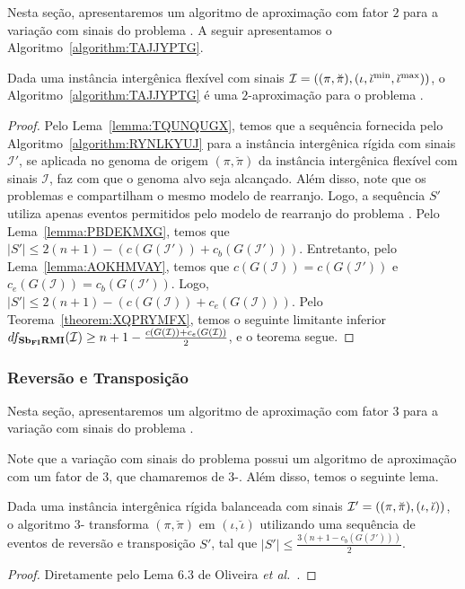 Nesta seção, apresentaremos um algoritmo de aproximação com fator $2$ para a variação com sinais do problema \SbFIRMI{}. A seguir apresentamos o Algoritmo~\ref{algorithm:TAJJYPTG}.



\begin{theorem}\label{theorem:PQWPQJDG}
Dada uma instância intergênica flexível com sinais $\mathcal{I} = ((\pi,\breve\pi),(\iota,\breve\iota^{\min},\break\breve\iota^{\max}))$, o Algoritmo~\ref{algorithm:TAJJYPTG} é uma $2$-aproximação para o problema \SbFIRMI{}.
\end{theorem}
\begin{proof}
Pelo Lema~\ref{lemma:TQUNQUGX}, temos que a sequência fornecida pelo Algoritmo~\ref{algorithm:RYNLKYUJ} para a instância intergênica rígida com sinais $\mathcal{I'}$, se aplicada no genoma de origem $(\pi,\breve\pi)$ da instância intergênica flexível com sinais $\mathcal{I}$, faz com que o genoma alvo seja alcançado. Além disso, note que os problemas \SbIRMI{} e \SbFIRMI{} compartilham o mesmo modelo de rearranjo. Logo, a sequência $S'$ utiliza apenas eventos permitidos pelo modelo de rearranjo do problema \SbFIRMI{}. Pelo Lema~\ref{lemma:PBDEKMXG}, temos que $|S'| \le 2(n + 1) - (c(G(\mathcal{I}')) + c_b(G(\mathcal{I}')))$. Entretanto, pelo Lema~\ref{lemma:AOKHMVAY}, temos que $c(G(\mathcal{I})) = c(G(\mathcal{I}'))$ e $c_e(G(\mathcal{I})) = c_b(G(\mathcal{I}'))$. Logo, $|S'| \le 2(n + 1) - (c(G(\mathcal{I})) + c_e(G(\mathcal{I})))$. Pelo Teorema~\ref{theorem:XQPRYMFX}, temos o seguinte limitante inferior $df_{\textbf{Sb\textsubscript{FI}RMI}}(\mathcal{I}) \ge {n+1} - \frac{c(G(\mathcal{I})) + c_e(G(\mathcal{I}))}{2}$, e o teorema segue.
\end{proof}

\subsubsection{Reversão e Transposição}

Nesta seção, apresentaremos um algoritmo de aproximação com fator $3$ para a variação com sinais do problema \SbFIRT{}. 

Note que a variação com sinais do problema \SbIRT{} possui um algoritmo de aproximação com um fator de $3$, que chamaremos de $3$-\SbIRT{}. Além disso, temos o seguinte lema.

\begin{lemma}\label{lemma:MNQTVIRT}
Dada uma instância intergênica rígida balanceada com sinais $\mathcal{I}'=((\pi,\breve\pi),\break(\iota,\breve\iota))$, o algoritmo $3$-\SbIRT{} transforma $(\pi,\breve\pi)$ em $(\iota,\breve\iota)$ utilizando uma sequência de eventos de reversão e transposição $S'$, tal que $|S'| \le \frac{3({n+1} - c_b(G(\mathcal{I}')))}{2}$.
\end{lemma}
\begin{proof}
Diretamente pelo Lema 6.3 de Oliveira \textit{et al.}~\cite{2021a-oliveira-etal}.
\end{proof}

